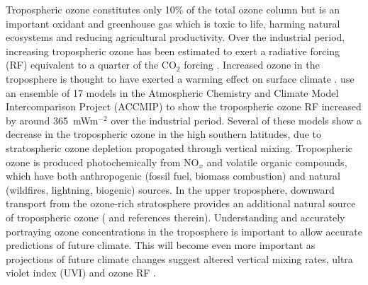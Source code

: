 
Tropospheric ozone constitutes only 10\% of the total ozone column but is an important oxidant and greenhouse gas which is toxic to life, harming natural ecosystems and reducing agricultural productivity.
Over the industrial period, increasing tropospheric ozone has been estimated to exert a radiative forcing (RF) equivalent to a quarter of the CO$_2$ forcing \citep{IPCC_Chapter2}.
Increased ozone in the troposphere is thought to have exerted a warming effect on surface climate \citep{Stevenson2013}.
\citet{Stevenson2013} use an ensemble of 17 models in the Atmospheric Chemistry and Climate Model Intercomparison Project (ACCMIP) to show the tropospheric ozone RF increased by around 365~mWm$^{-2}$ over the industrial period.
Several of these models show a decrease in the tropospheric ozone in the high southern latitudes, due to stratospheric ozone depletion propogated through vertical mixing.
Tropospheric ozone is produced photochemically from NO$_x$ and volatile organic compounds, which have both anthropogenic (fossil fuel, biomass combustion) and natural (wildfires, lightning, biogenic) sources.
In the upper troposphere, downward transport from the ozone-rich stratosphere provides an additional natural source of tropospheric ozone (\citet{Jacobson2000} and references therein).
Understanding and accurately portraying ozone concentrations in the troposphere is important to allow accurate predictions of future climate.
This will become even more important as projections of future climate changes suggest altered vertical mixing rates, ultra violet index (UVI) and ozone RF \citep{Hegglin2009}.

